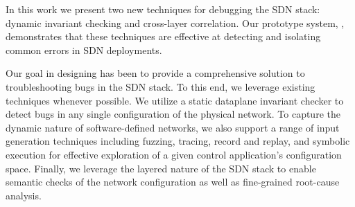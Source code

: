 In this work we present two new techniques for debugging the SDN stack:
dynamic invariant checking and cross-layer correlation. Our prototype system,
\projectname{}, demonstrates that these techniques are effective at detecting and
isolating common errors in SDN deployments.

Our goal in designing \projectname{} has been to provide a comprehensive solution to
troubleshooting bugs in the SDN stack. To this end, we
leverage existing techniques whenever possible. We utilize a static dataplane invariant
checker \cite{anteater} to detect bugs in any single configuration of the
physical network. To capture the dynamic nature of software-defined networks,
we also support a range of input generation techniques including fuzzing, tracing, record and
replay, and symbolic execution for effective exploration of a given control
application's configuration space. Finally, we leverage the layered nature of the
SDN stack to enable semantic checks of the network configuration  as
well as fine-grained root-cause analysis.


%
%
%
%
%

